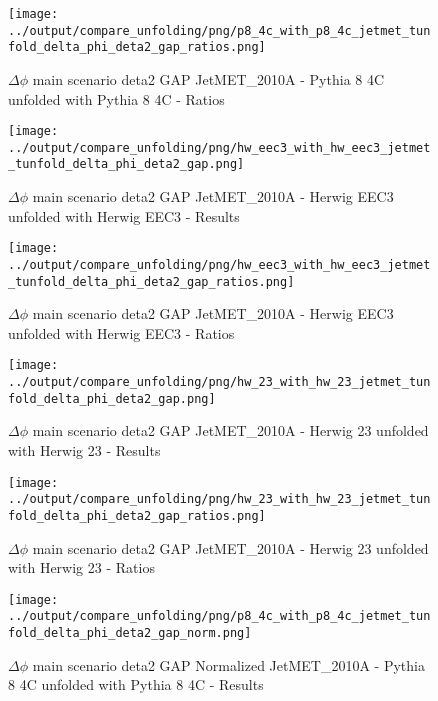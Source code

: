 \documentclass[11pt]{book}
\begin{document}
\begin{figure}[ht]
\centering
\texttt{[image: ../output/compare\_unfolding/png/p8\_4c\_with\_p8\_4c\_jetmet\_tunfold\_delta\_phi\_deta2\_gap\_ratios.png]}
\caption{$\Delta\phi$ main scenario deta2 GAP JetMET\_2010A - Pythia 8 4C unfolded with Pythia 8 4C - Ratios}
\label{p8_p8_jetmet_tunfold_delta_phi_deta2_gap_b}
\end{figure}

\begin{figure}[ht]
\centering
\texttt{[image: ../output/compare\_unfolding/png/hw\_eec3\_with\_hw\_eec3\_jetmet\_tunfold\_delta\_phi\_deta2\_gap.png]}
\caption{$\Delta\phi$ main scenario deta2 GAP JetMET\_2010A - Herwig EEC3 unfolded with Herwig EEC3 - Results}
\label{hw_eec3_hw_eec3_jetmet_tunfold_delta_phi_deta2_gap_a}
\end{figure}

\begin{figure}[ht]
\centering
\texttt{[image: ../output/compare\_unfolding/png/hw\_eec3\_with\_hw\_eec3\_jetmet\_tunfold\_delta\_phi\_deta2\_gap\_ratios.png]}
\caption{$\Delta\phi$ main scenario deta2 GAP JetMET\_2010A - Herwig EEC3 unfolded with Herwig EEC3 - Ratios}
\label{hw_eec3_hw_eec3_jetmet_tunfold_delta_phi_deta2_gap_b}
\end{figure}

\begin{figure}[ht]
\centering
\texttt{[image: ../output/compare\_unfolding/png/hw\_23\_with\_hw\_23\_jetmet\_tunfold\_delta\_phi\_deta2\_gap.png]}
\caption{$\Delta\phi$ main scenario deta2 GAP JetMET\_2010A - Herwig 23 unfolded with Herwig 23 - Results}
\label{hw_23_hw_23_jetmet_tunfold_delta_phi_deta2_gap_a}
\end{figure}

\begin{figure}[ht]
\centering
\texttt{[image: ../output/compare\_unfolding/png/hw\_23\_with\_hw\_23\_jetmet\_tunfold\_delta\_phi\_deta2\_gap\_ratios.png]}
\caption{$\Delta\phi$ main scenario deta2 GAP JetMET\_2010A - Herwig 23 unfolded with Herwig 23 - Ratios}
\label{hw_23_hw_23_jetmet_tunfold_delta_phi_deta2_gap_b}
\end{figure}



\begin{figure}[ht]
\centering
\texttt{[image: ../output/compare\_unfolding/png/p8\_4c\_with\_p8\_4c\_jetmet\_tunfold\_delta\_phi\_deta2\_gap\_norm.png]}
\caption{$\Delta\phi$ main scenario deta2 GAP Normalized JetMET\_2010A - Pythia 8 4C unfolded with Pythia 8 4C - Results}
\label{p8_p8_jetmet_tunfold_delta_phi_deta2_gap_norm_a}
\end{figure}
\end{document}
